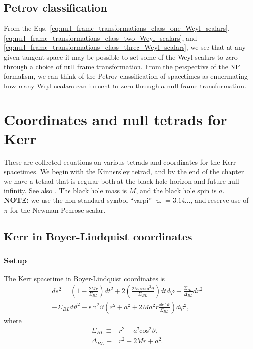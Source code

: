\documentclass[12pt]{report}
\begin{document}
\section{Petrov classification}
	From the 
Eqs.~\eqref{eq:null_frame_transformations_class_one_Weyl_scalars},
\eqref{eq:null_frame_transformations_class_two_Weyl_scalars},
and \eqref{eq:null_frame_transformations_class_three_Weyl_scalars}, we see
that at any given tangent space it may be possible to set some of the
Weyl scalars to zero through a choice of null frame transformation. From
the perspective of the NP formalism, 
we can think of the  Petrov classification of spacetimes as enuermating 
how many Weyl scalars can be sent to zero through a null
frame transformation.
\chapter{Coordinates and null tetrads for Kerr}
These are collected equations on various tetrads and coordinates
for the Kerr spacetimes.
We begin with the Kinnersley tetrad, and by the end of the chapter
we have a tetrad that is regular both at the black hole horizon and
future null infinity. See also \cite{Ripley:2020xby}.
The black hole mass is $M$, and the black hole spin is $a$.
{\bf NOTE:} we use the non-standard symbol ``varpi'' $\varpi=3.14...$,
and reserve use of $\pi$ for the Newman-Penrose scalar.
\section{Kerr in Boyer-Lindquist coordinates}
\subsection{Setup}
	The Kerr spacetime in Boyer-Lindquist coordinates is
\begin{align}
\label{eq:Kerr_BL_coords}
	ds^2
	=
	\left(1-\frac{2Mr}{\Sigma_{BL}}\right)dt^2
+	2\left(\frac{2Mar\mathrm{sin}^2\vartheta}{\Sigma_{BL}}\right)dtd\varphi
-	\frac{\Sigma_{BL}}{\Delta_{BL}}dr^2
	\nonumber \\
-	\Sigma_{BL}d\vartheta^2
-	\mathrm{sin}^2\vartheta\left(
		r^2+a^2+2Ma^2r\frac{\mathrm{sin}^2\vartheta}{\Sigma_{BL}}
	\right)
	d\varphi^2
	,
\end{align}
	where
\begin{subequations}
\begin{align}
	\Sigma_{BL}\equiv & r^2+a^2\mathrm{cos}^2\vartheta 
	, \\
	\Delta_{BL}\equiv & r^2-2Mr+a^2
	.
\end{align}
\end{subequations}
\end{document}
